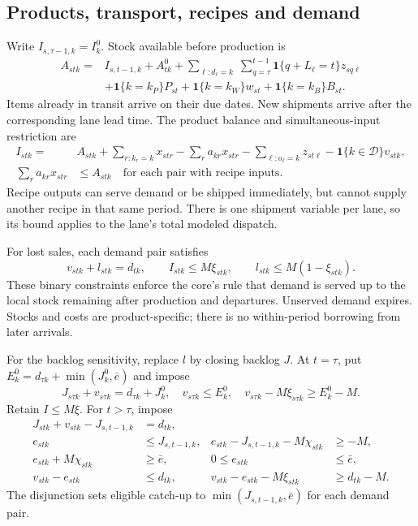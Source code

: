 \documentclass[preprint,11pt,authoryear]{elsarticle}
\begin{document}
\subsection{Products, transport, recipes and demand}
Write $I_{s,\tau-1,k}=I^0_k$. Stock available before production is
\begin{align}
 A_{stk}={}&I_{s,t-1,k}+A^0_{tk}
 +\sum_{\ell:d_\ell=k}\;\sum_{q=\tau}^{t-1}\mathbf1\{q+L_\ell=t\}z_{sq\ell}\nonumber\\
 &+\mathbf1\{k=k_P\}P_{st}+\mathbf1\{k=k_W\}w_{st}
 +\mathbf1\{k=k_B\}B_{st}.\label{eq:net_arrivals}
\end{align}
Items already in transit arrive on their due dates. New shipments arrive after the corresponding lane lead time. The product balance and simultaneous-input restriction are
\begin{align}
 I_{stk}={}&A_{stk}+\sum_{r:k_r=k}x_{str}-\sum_r a_{kr}x_{str}
 -\sum_{\ell:o_\ell=k}z_{st\ell}-\mathbf1\{k\in\mathcal D\}v_{stk},\label{eq:net_balance}\\
 \sum_r a_{kr}x_{str}&\le A_{stk}\quad\text{for each pair with recipe inputs}.\label{eq:net_bom}
\end{align}
Recipe outputs can serve demand or be shipped immediately, but cannot supply another recipe in that same period. There is one shipment variable per lane, so its bound applies to the lane's total modeled dispatch.

For lost sales, each demand pair satisfies
\begin{equation}
 v_{stk}+l_{stk}=d_{tk},\qquad
 I_{stk}\le M\xi_{stk},\qquad l_{stk}\le M(1-\xi_{stk}).\label{eq:net_lost}
\end{equation}
These binary constraints enforce the core's rule that demand is served up to the local stock remaining after production and departures. Unserved demand expires. Stocks and costs are product-specific; there is no within-period borrowing from later arrivals.

For the backlog sensitivity, replace $l$ by closing backlog $J$. At $t=\tau$, put $E^0_k=d_{\tau k}+\min(J^0_k,\bar e)$ and impose
\begin{equation}
 J_{s\tau k}+v_{s\tau k}=d_{\tau k}+J^0_k,\quad
 v_{s\tau k}\le E^0_k,\quad v_{s\tau k}-M\xi_{s\tau k}\ge E^0_k-M.\label{eq:net_backlog_initial}
\end{equation}
Retain $I\le M\xi$. For $t>\tau$, impose
\begin{align}
 J_{stk}+v_{stk}-J_{s,t-1,k}&=d_{tk},\nonumber\\
 e_{stk}&\le J_{s,t-1,k},&e_{stk}-J_{s,t-1,k}-M\chi_{stk}&\ge-M,\nonumber\\
 e_{stk}+M\chi_{stk}&\ge\bar e,&0\le e_{stk}&\le\bar e,\nonumber\\
 v_{stk}-e_{stk}&\le d_{tk},&v_{stk}-e_{stk}-M\xi_{stk}&\ge d_{tk}-M.\label{eq:net_backlog}
\end{align}
The disjunction sets eligible catch-up to $\min(J_{s,t-1,k},\bar e)$ for each demand pair.
\end{document}
